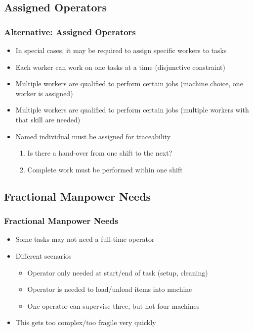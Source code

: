 \subsection{Assigned Operators}

\begin{frame}
\frametitle{Alternative: Assigned Operators \navail}
\begin{itemize}
\item In special cases, it may be required to assign specific workers to tasks
\item Each worker can work on one tasks at a time (disjunctive constraint)
\item Multiple workers are qualified to perform certain jobs (machine choice, one worker is assigned)
\item Multiple workers are qualified to perform certain jobs (multiple workers with that skill are needed)
\item Named individual must be assigned for traceability 
\begin{enumerate}
\item Is there a hand-over from one shift to the next?
\item Complete work must be performed within one shift
\end{enumerate}
\end{itemize}
\end{frame}



\subsection{Fractional Manpower Needs}

\begin{frame}
\frametitle{Fractional Manpower Needs \navail}
\begin{itemize}
\item Some tasks may not need a full-time operator
\item Different scenarios
\begin{itemize}
\item Operator only needed at start/end of task (setup, cleaning)
\item Operator is needed to load/unload items into machine
\item One operator can supervise three, but not four machines
\end{itemize}
\item This gets too complex/too fragile very quickly
\end{itemize}
\end{frame}



